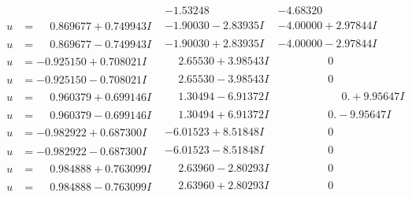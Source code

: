 \documentclass[1p]{elsarticle_modified}
\theoremstyle{definition}
\begin{document}
$$\begin{array}{c|c|c}
 & -1.53248\phantom{ +0.000000I} & -4.68320\phantom{ +0.000000I} \\ \hline\begin{aligned}
u &= \phantom{-}0.869677 + 0.749943 I\end{aligned}
 & -1.90030 - 2.83935 I & -4.00000 + 2.97844 I \\ \hline\begin{aligned}
u &= \phantom{-}0.869677 - 0.749943 I\end{aligned}
 & -1.90030 + 2.83935 I & -4.00000 - 2.97844 I \\ \hline\begin{aligned}
u &= -0.925150 + 0.708021 I\end{aligned}
 & \phantom{-}2.65530 + 3.98543 I & \phantom{-0.000000 } 0 \\ \hline\begin{aligned}
u &= -0.925150 - 0.708021 I\end{aligned}
 & \phantom{-}2.65530 - 3.98543 I & \phantom{-0.000000 } 0 \\ \hline\begin{aligned}
u &= \phantom{-}0.960379 + 0.699146 I\end{aligned}
 & \phantom{-}1.30494 - 6.91372 I & \phantom{-0.000000 -}0. + 9.95647 I \\ \hline\begin{aligned}
u &= \phantom{-}0.960379 - 0.699146 I\end{aligned}
 & \phantom{-}1.30494 + 6.91372 I & \phantom{-0.000000 } 0. - 9.95647 I \\ \hline\begin{aligned}
u &= -0.982922 + 0.687300 I\end{aligned}
 & -6.01523 + 8.51848 I & \phantom{-0.000000 } 0 \\ \hline\begin{aligned}
u &= -0.982922 - 0.687300 I\end{aligned}
 & -6.01523 - 8.51848 I & \phantom{-0.000000 } 0 \\ \hline\begin{aligned}
u &= \phantom{-}0.984888 + 0.763099 I\end{aligned}
 & \phantom{-}2.63960 - 2.80293 I & \phantom{-0.000000 } 0 \\ \hline\begin{aligned}
u &= \phantom{-}0.984888 - 0.763099 I\end{aligned}
 & \phantom{-}2.63960 + 2.80293 I & \phantom{-0.000000 } 0 \\ \hline\begin{aligned}

\end{aligned}
\end{array}$$
\end{document}

